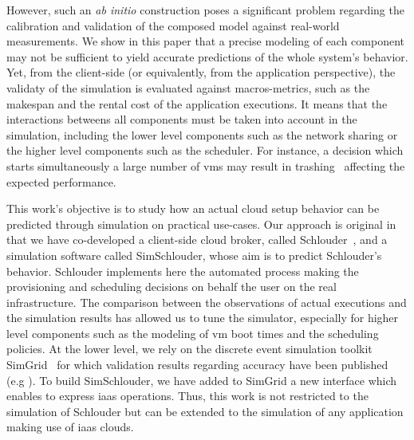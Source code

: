 \documentclass[a4paper,10pt]{article}
\begin{document}
However, such  an \textit{ab  initio} construction  poses a  significant problem
regarding  the  calibration  and  validation   of  the  composed  model  against
real-world measurements. We  show in this paper that a  precise modeling of each
component  may not  be sufficient  to yield  accurate predictions  of the  whole
system's  behavior.   Yet,  from  the client-side  (or  equivalently,  from  the
application perspective),  the validaty of  the simulation is  evaluated against
macros-metrics, such  as the  makespan and  the rental  cost of  the application
executions. It means that the interactions betweens all components must be taken
into account in the simulation, including the lower level components such as the
network  sharing or  the higher  level components  such as  the scheduler.   For
instance, a decision which starts simultaneously  a large number of \acp{vm} may
result in trashing~\cite{MarshallKF10} affecting the expected performance.

This work's  objective is  to study how  an actual cloud  setup behavior  can be
predicted through simulation on practical use-cases. Our approach is original in
that    we   have    co-developed   a    client-side   cloud    broker,   called
Schlouder~\cite{Michon17}, and a simulation  software called SimSchlouder, whose
aim is to predict Schlouder's behavior.  Schlouder implements here the automated
process making the  provisioning and scheduling decisions on behalf  the user on
the  real infrastructure.  The  comparison between  the  observations of  actual
executions and  the simulation  results has  allowed us  to tune  the simulator,
especially for  higher level  components such  as the  modeling of  \ac{vm} boot
times and the scheduling  policies. At the lower level, we  rely on the discrete
event simulation  toolkit SimGrid~\cite{simgrid08} for which  validation results
regarding        accuracy         have        been         published        (e.g
\cite{StanisicTLVM15,VelhoSCL13}).  To  build  SimSchlouder, we  have  added  to
SimGrid a  new interface  which enables to  express \ac{iaas}  operations. Thus,
this work is not  restricted to the simulation of Schlouder  but can be extended
to the simulation of any application making use of \ac{iaas} clouds.
\end{document}

